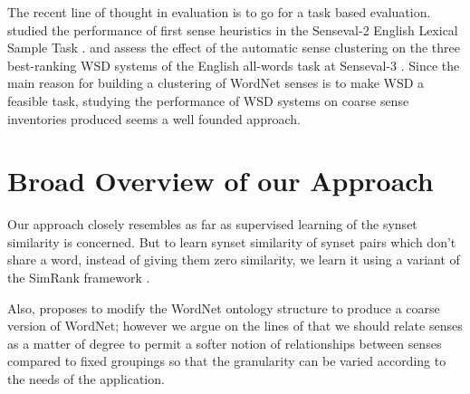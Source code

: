 The recent line of thought in evaluation is to go for a task based evaluation. \citep{mccarthy2006relating} studied the performance of first sense heuristics in the Senseval-2 English Lexical Sample Task \citep{Senseval2LexicalSampleTask}. \citep{Navigli06meaningfulclustering} and \citep{snow07mergesense} assess the effect of the automatic sense clustering on the three best-ranking WSD systems of the English all-words task at Senseval-3 \citep{Senseval3AllWordsTask}. Since the main reason for building a clustering of WordNet senses is to make WSD a feasible task, studying the performance of WSD systems on coarse sense inventories produced seems a well founded approach.

\section{Broad Overview of our Approach}
Our approach closely resembles \citep{snow07mergesense} as far as supervised learning of the synset similarity is concerned. But to learn synset similarity of synset pairs which don't share a word, instead of giving them zero similarity, we learn it using a variant of the SimRank framework \citep{Jeh02simrank}. 

Also, \citep{snow07mergesense} proposes to modify the WordNet ontology structure to produce a coarse version of WordNet; however we argue on the lines of \citep{mccarthy2006relating} that we should relate senses as a matter of degree to permit a softer notion of relationships between senses compared to fixed groupings so that the granularity can be varied according to the needs of the application.